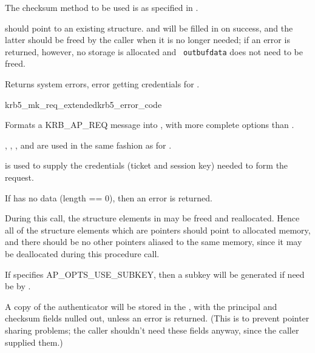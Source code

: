 The checksum method to be used is as specified in . 


 should point to an existing 
structure.   and
 will be filled in on success, and the latter
should be freed by the caller when it is no longer needed; if an error
is returned, however, no storage is allocated and {\tt
outbuf{\ptsto}data} does not need to be freed.

Returns system errors, error getting credentials for
.

\begin{funcdecl}{krb5_mk_req_extended}{krb5_error_code}{\funcinout}
\funcin
{}
\funcout
{}
\end{funcdecl}

Formats a KRB_AP_REQ message into , with more complete
options than .

, , ,
and  are used in the same fashion as for
.

 is used to supply the credentials (ticket and session
key) needed to form the request.

If  has no data (length == 0), then an
error is returned. 

During this call, the structure elements in  may be
freed and reallocated.  Hence all of the structure elements which are
pointers should point to allocated memory, and there should be no other
pointers aliased to the same memory, since it may be deallocated during
this procedure call.


If  specifies AP_OPTS_USE_SUBKEY, then a
subkey will be generated if need be by .

A copy of the authenticator will be stored in the
, with the principal and checksum fields nulled
out, unless an error is returned.  (This is to prevent pointer sharing
problems; the caller shouldn't need these fields anyway, since the
caller supplied them.)

